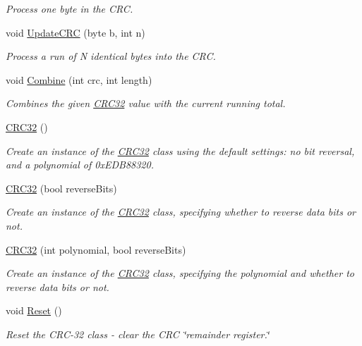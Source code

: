 \begin{DoxyCompactItemize}
\begin{DoxyCompactList}\small\item\em Process one byte in the C\+RC. \end{DoxyCompactList}\item 
void \mbox{\hyperlink{class_super_tiled2_unity_1_1_ionic_1_1_crc_1_1_c_r_c32_a17ab72a7c24c3aa682eb14cc17f34c16}{Update\+C\+RC}} (byte b, int n)
\begin{DoxyCompactList}\small\item\em Process a run of N identical bytes into the C\+RC. \end{DoxyCompactList}\item 
void \mbox{\hyperlink{class_super_tiled2_unity_1_1_ionic_1_1_crc_1_1_c_r_c32_a947f4c65cbeb6d2deae11477b0c18893}{Combine}} (int crc, int length)
\begin{DoxyCompactList}\small\item\em Combines the given \mbox{\hyperlink{class_super_tiled2_unity_1_1_ionic_1_1_crc_1_1_c_r_c32}{C\+R\+C32}} value with the current running total. \end{DoxyCompactList}\item 
\mbox{\hyperlink{class_super_tiled2_unity_1_1_ionic_1_1_crc_1_1_c_r_c32_aaa06a281b345284e2703ffb94ba46433}{C\+R\+C32}} ()
\begin{DoxyCompactList}\small\item\em Create an instance of the \mbox{\hyperlink{class_super_tiled2_unity_1_1_ionic_1_1_crc_1_1_c_r_c32}{C\+R\+C32}} class using the default settings\+: no bit reversal, and a polynomial of 0x\+E\+D\+B88320. \end{DoxyCompactList}\item 
\mbox{\hyperlink{class_super_tiled2_unity_1_1_ionic_1_1_crc_1_1_c_r_c32_a08b8fd33fe8fb5840d9e20eecf878c67}{C\+R\+C32}} (bool reverse\+Bits)
\begin{DoxyCompactList}\small\item\em Create an instance of the \mbox{\hyperlink{class_super_tiled2_unity_1_1_ionic_1_1_crc_1_1_c_r_c32}{C\+R\+C32}} class, specifying whether to reverse data bits or not. \end{DoxyCompactList}\item 
\mbox{\hyperlink{class_super_tiled2_unity_1_1_ionic_1_1_crc_1_1_c_r_c32_a55eee500667c8e6f5e1b53436829715b}{C\+R\+C32}} (int polynomial, bool reverse\+Bits)
\begin{DoxyCompactList}\small\item\em Create an instance of the \mbox{\hyperlink{class_super_tiled2_unity_1_1_ionic_1_1_crc_1_1_c_r_c32}{C\+R\+C32}} class, specifying the polynomial and whether to reverse data bits or not. \end{DoxyCompactList}\item 
void \mbox{\hyperlink{class_super_tiled2_unity_1_1_ionic_1_1_crc_1_1_c_r_c32_aacb0cd763cb7bfd3bec2c2aa2d961b19}{Reset}} ()
\begin{DoxyCompactList}\small\item\em Reset the C\+R\+C-\/32 class -\/ clear the C\+RC \char`\"{}remainder register.\char`\"{} \end{DoxyCompactList}\end{DoxyCompactItemize}
